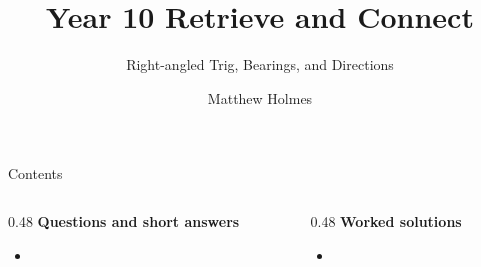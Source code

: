 \documentclass[aspectratio=169,11pt]{beamer}
\title{Year 10 Retrieve and Connect}
\subtitle{Right-angled Trig, Bearings, and Directions}
\author{Matthew Holmes}
\date{} %
\begin{document}
\frame{\titlepage}

\begin{frame}{Contents}
\small
\begin{columns}[T]
\begin{column}{0.48\textwidth}
\textbf{Questions and short answers}
\begin{itemize}
\item \hyperlink{q-st1}{}
\end{itemize}
\end{column}
\begin{column}{0.48\textwidth}
\textbf{Worked solutions}
\begin{itemize}
\item \hyperlink{work-st1}{}
\end{itemize}
\end{column}
\end{columns}
\end{frame}
\end{document}
